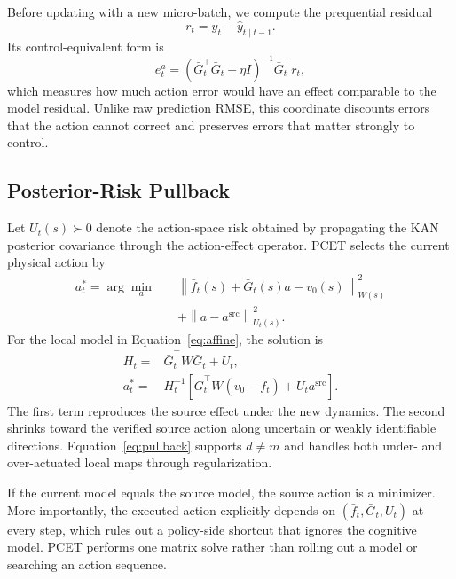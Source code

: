 \documentclass[letterpaper]{article}
\begin{document}
Before updating with a new micro-batch, we compute the prequential residual
\begin{equation}
r_t=y_t-\hat y_{t\mid t-1}.
\end{equation}
Its control-equivalent form is
\begin{equation}
e_t^a=(\bar G_t^{\top}\bar G_t+\eta I)^{-1}\bar G_t^{\top}r_t,
\label{eq:action-residual}
\end{equation}
which measures how much action error would have an effect comparable to the
model residual.  Unlike raw prediction RMSE, this coordinate discounts errors
that the action cannot correct and preserves errors that matter strongly to
control.

\subsection{Posterior-Risk Pullback}

Let $U_t(s)\succ 0$ denote the action-space risk obtained by propagating the
KAN posterior covariance through the action-effect operator.  PCET selects the
current physical action by
\begin{equation}
\begin{aligned}
a_t^*=\arg\min_a\quad
&\left\|\bar f_t(s)+\bar G_t(s)a-v_0(s)\right\|_{W(s)}^2\\
&+\left\|a-a^{\mathrm{src}}\right\|_{U_t(s)}^2.
\end{aligned}
\label{eq:pullback-objective}
\end{equation}
For the local model in Equation~\eqref{eq:affine}, the solution is
\begin{equation}
\begin{aligned}
H_t={}&\bar G_t^{\top}W\bar G_t+U_t,\\
a_t^*={}&H_t^{-1}
\left[\bar G_t^{\top}W(v_0-\bar f_t)+U_ta^{\mathrm{src}}\right].
\end{aligned}
\label{eq:pullback}
\end{equation}
The first term reproduces the source effect under the new dynamics.  The second
shrinks toward the verified source action along uncertain or weakly
identifiable directions.  Equation~\eqref{eq:pullback} supports $d\neq m$ and
handles both under- and over-actuated local maps through regularization.

If the current model equals the source model, the source action is a minimizer.
More importantly, the executed action explicitly depends on
$(\bar f_t,\bar G_t,U_t)$ at every step, which rules out a policy-side shortcut
that ignores the cognitive model.  PCET performs one matrix solve rather than
rolling out a model or searching an action sequence.
\end{document}
